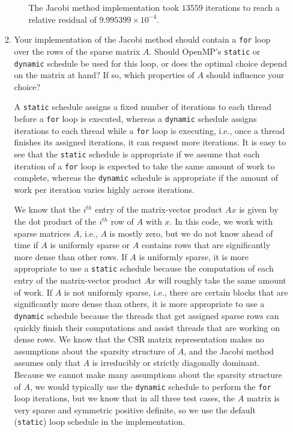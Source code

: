 \documentclass{article}
\begin{document}
\begin{enumerate}
\begin{enumerate}
\begin{enumerate}
            \par 
            The Jacobi method implementation took $13559$ iterations to reach a relative residual of $9.995399 \times 10^{-4}$.
        \end{enumerate}
        \item Your implementation of the Jacobi method should contain a \verb|for| loop over the rows of the sparse matrix $A$.
        Should OpenMP's \verb|static| or \verb|dynamic| schedule be used for this loop, or does the optimal choice depend on the matrix at hand?
        If so, which properties of $A$ should influence your choice?
        \par 
        A \verb|static| schedule assigns a fixed number of iterations to each thread before a \verb|for| loop is executed, whereas a \verb|dynamic| schedule assigns iterations to each thread while a \verb|for| loop is executing, i.e., once a thread finishes its assigned iterations, it can request more iterations.
        It is easy to see that the \verb|static| schedule is appropriate if we assume that each iteration of a \verb|for| loop is expected to take the same amount of work to complete, whereas the \verb|dynamic| schedule is appropriate if the amount of work per iteration varies highly across iterations.
        \par 
        We know that the $i^{th}$ entry of the matrix-vector product $Ax$ is given by the dot product of the $i^{th}$ row of $A$ with $x$.
        In this code, we work with sparse matrices $A$, i.e., $A$ is mostly zero, but we do not know ahead of time if $A$ is uniformly sparse or $A$ contains rows that are significantly more dense than other rows.
        If $A$ is uniformly sparse, it is more appropriate to use a \verb|static| schedule because the computation of each entry of the matrix-vector product $Ax$ will roughly take the same amount of work.
        If $A$ is not uniformly sparse, i.e., there are certain blocks that are significantly more dense than others, it is more appropriate to use a \verb|dynamic| schedule because the threads that get assigned sparse rows can quickly finish their computations and assist threads that are working on dense rows.
        We know that the CSR matrix representation makes no assumptions about the sparsity structure of $A$, and the Jacobi method assumes only that $A$ is irreducibly or strictly diagonally dominant.
        Because we cannot make many assumptions about the sparsity structure of $A$, we would typically use the \verb|dynamic| schedule to perform the \verb|for| loop iterations, but we know that in all three test cases, the $A$ matrix is very sparse and symmetric positive definite, so we use the default (\verb|static|) loop schedule in the implementation.
    \end{enumerate}
\end{enumerate}
\end{document}
